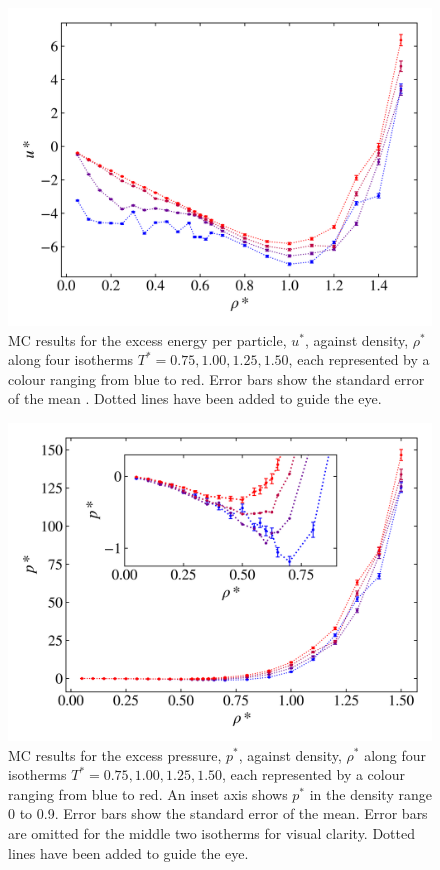 \documentclass[10pt, twocolumn]{revtex4}    %
\begin{document}
\begin{figure}
	\includegraphics[width=\linewidth]{figures/excessEnergyPressure/excessEnergy.png}
	\caption{MC results for the excess energy per particle, $u^{*}$, against density, $\rho{}^{*}$ along four isotherms $T^{*}=0.75, 1.00, 1.25, 1.50$, each represented by a colour ranging from blue to red. Error bars show the standard error of the mean \cite{errors}. Dotted lines have been added to guide the eye.}
	\label{fig:excessEnergy}
\end{figure}
	
\begin{figure}
	\includegraphics[width=\linewidth]{figures/excessEnergyPressure/excessPressure.png}
	\caption{MC results for the excess pressure, $p^{*}$, against density, $\rho{}^{*}$ along four isotherms $T^{*}=0.75, 1.00, 1.25, 1.50$, each represented by a colour ranging from blue to red. An inset axis shows $p^{*}$ in the density range \num{0} to \num{0.9}. Error bars show the standard error of the mean. Error bars are omitted for the middle two isotherms for visual clarity. Dotted lines have been added to guide the eye.}
	\label{fig:excessPressure}
\end{figure}
\end{document}
